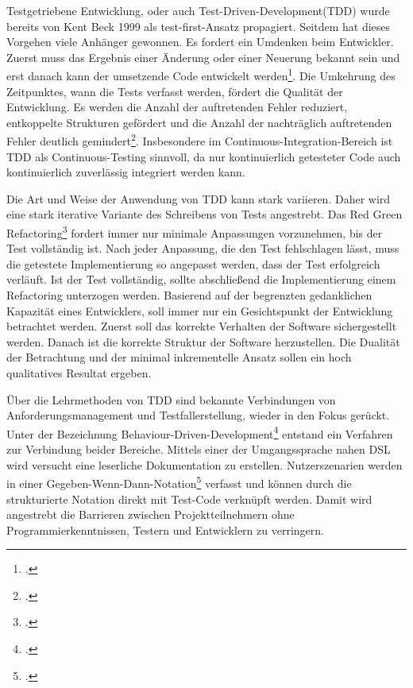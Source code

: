 Testgetriebene Entwicklung, oder auch Test-Driven-Development(TDD) wurde bereits von Kent Beck 1999 als \glqq test-first\grqq{}-Ansatz propagiert. Seitdem hat dieses Vorgehen viele Anhänger gewonnen. Es fordert ein Umdenken beim Entwickler. Zuerst muss das Ergebnis einer Änderung oder einer Neuerung bekannt sein und erst danach kann der umsetzende Code entwickelt werden\footcite[vgl.][Kap. Understanding TDD]{tdd-java}. Die Umkehrung des Zeitpunktes, wann die Tests verfasst werden, fördert die Qualität der Entwicklung. Es werden die Anzahl der auftretenden Fehler reduziert, entkoppelte Strukturen gefördert und die Anzahl der nachträglich auftretenden Fehler deutlich gemindert\footcite[vgl.][]{tdd-ci-effectivness}.
Insbesondere im Continuous-Integration-Bereich ist TDD als Continuous-Testing sinnvoll, da nur kontinuierlich getesteter Code auch kontinuierlich zuverlässig integriert werden kann.

Die Art und Weise der Anwendung von TDD kann stark variieren. Daher wird eine stark iterative Variante des Schreibens von Tests angestrebt. Das \glqq Red Green Refactoring\grqq{}\footcite[vgl.][Kap. Red-Green-Refactor]{tdd-java} fordert immer nur minimale Anpassungen vorzunehmen, bis der Test vollständig ist. Nach jeder Anpassung, die den Test fehlschlagen lässt, muss die getestete Implementierung so angepasst werden, dass der Test erfolgreich verläuft. Ist der Test vollständig, sollte abschließend die Implementierung einem Refactoring unterzogen werden. Basierend auf der begrenzten gedanklichen Kapazität eines Entwicklers, soll immer nur ein Gesichtspunkt der Entwicklung betrachtet werden. Zuerst soll das korrekte Verhalten der Software sichergestellt werden. Danach ist die korrekte Struktur der Software herzustellen. Die Dualität der Betrachtung und der minimal inkrementelle Ansatz sollen ein hoch qualitatives Resultat ergeben.

Über die Lehrmethoden von TDD sind bekannte Verbindungen von Anforderungsmanagement und Testfallerstellung, wieder in den Fokus gerückt. Unter der Bezeichnung \glqq Behaviour-Driven-Development\grqq{}\footcite{bdd-north} entstand ein Verfahren zur Verbindung beider Bereiche. Mittels einer der Umgangssprache nahen DSL wird versucht eine leserliche Dokumentation zu erstellen. Nutzerszenarien werden in einer Gegeben-Wenn-Dann-Notation\footcite{fowler-gwt} verfasst und können durch die strukturierte Notation direkt mit Test-Code verknüpft werden. Damit wird angestrebt die Barrieren zwischen Projektteilnehmern ohne Programmierkenntnissen, Testern und Entwicklern zu verringern.

